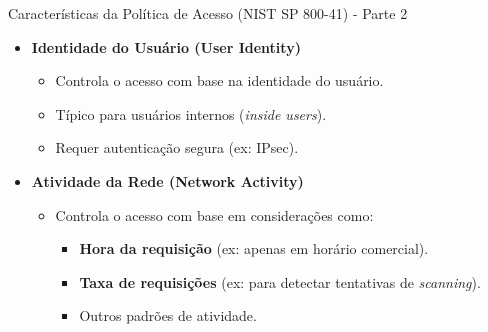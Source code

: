 \begin{frame}{Características da Política de Acesso (NIST SP 800-41) - Parte 2}
    \begin{itemize}
        \item \textbf{Identidade do Usuário (User Identity)}
              \begin{itemize}
                  \item Controla o acesso com base na identidade do usuário.
                  \item Típico para usuários internos (\textit{inside users}).
                  \item Requer autenticação segura (ex: IPsec).
              \end{itemize}

        \item \textbf{Atividade da Rede (Network Activity)}
              \begin{itemize}
                  \item Controla o acesso com base em considerações como:
                        \begin{itemize}
                            \item \textbf{Hora da requisição} (ex: apenas em horário comercial).
                            \item \textbf{Taxa de requisições} (ex: para detectar tentativas de \textit{scanning}).
                            \item Outros padrões de atividade.
                        \end{itemize}
              \end{itemize}
    \end{itemize}
\end{frame}

